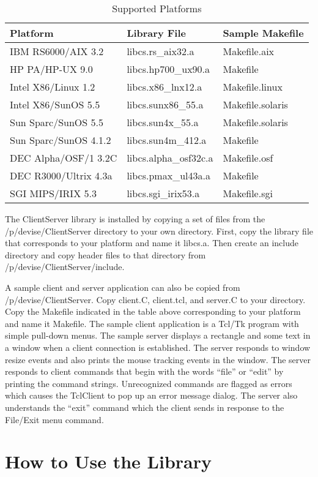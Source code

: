 \begin{table}[h]
\centering
\caption{Supported Platforms}
\bigskip
\begin{tabular}{lll}
Platform & Library File & Sample Makefile \\
\hline
IBM RS6000/AIX 3.2    & libcs.rs\_aix32.a     & Makefile.aix \\
HP PA/HP-UX 9.0       & libcs.hp700\_ux90.a   & Makefile \\
Intel X86/Linux 1.2   & libcs.x86\_lnx12.a    & Makefile.linux \\
Intel X86/SunOS 5.5   & libcs.sunx86\_55.a    & Makefile.solaris \\
Sun Sparc/SunOS 5.5   & libcs.sun4x\_55.a     & Makefile.solaris \\
Sun Sparc/SunOS 4.1.2 & libcs.sun4m\_412.a    & Makefile \\
DEC Alpha/OSF/1 3.2C  & libcs.alpha\_osf32c.a & Makefile.osf \\
DEC R3000/Ultrix 4.3a & libcs.pmax\_ul43a.a   & Makefile \\
SGI MIPS/IRIX 5.3     & libcs.sgi\_irix53.a   & Makefile.sgi
\end{tabular}
\end{table}

The ClientServer library is installed by copying a set of files from
the /p/devise/ClientServer directory to your own directory. First,
copy the library file that corresponds to your platform and name it
libcs.a. Then create an include directory and copy header files to
that directory from /p/devise/ClientServer/include.

A sample client and server application can also be copied from
/p/devise/ClientServer. Copy client.C, client.tcl, and server.C to
your directory. Copy the Makefile indicated in the table above
corresponding to your platform and name it Makefile. The sample client
application is a Tcl/Tk program with simple pull-down menus. The
sample server displays a rectangle and some text in a window when a
client connection is established. The server responds to window resize
events and also prints the mouse tracking events in the window. The
server responds to client commands that begin with the words ``file''
or ``edit'' by printing the command strings.  Unrecognized commands
are flagged as errors which causes the TclClient to pop up an error
message dialog. The server also understands the ``exit'' command which
the client sends in response to the File/Exit menu command.

\section{How to Use the Library\label{usage}}

